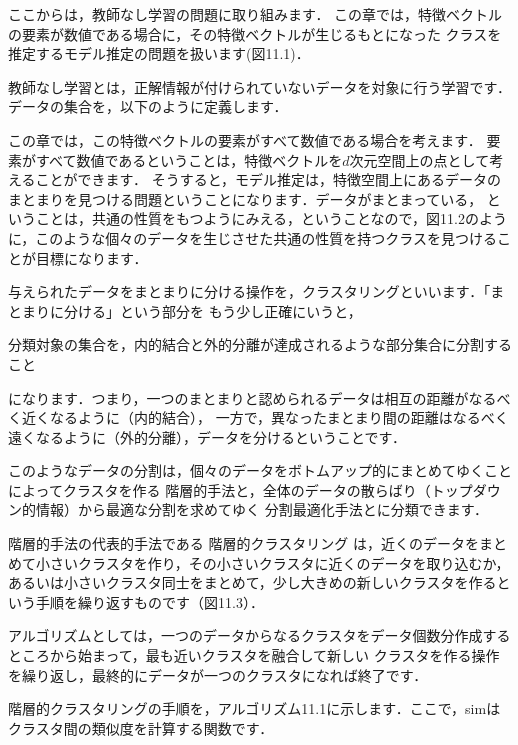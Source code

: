
ここからは，教師なし学習の問題に取り組みます．
この章では，特徴ベクトルの要素が数値である場合に，その特徴ベクトルが生じるもとになった
クラスを推定するモデル推定の問題を扱います(図11.1)．


教師なし学習とは，正解情報が付けられていないデータを対象に行う学習です．
データの集合を，以下のように定義します．

この章では，この特徴ベクトルの要素がすべて数値である場合を考えます．
要素がすべて数値であるということは，特徴ベクトルを$d$次元空間上の点として考えることができます．
そうすると，モデル推定は，特徴空間上にあるデータのまとまりを見つける問題ということになります．データがまとまっている，
ということは，共通の性質をもつようにみえる，ということなので，図11.2のように，このような個々のデータを生じさせた共通の性質を持つクラスを見つけることが目標になります．


与えられたデータをまとまりに分ける操作を，クラスタリングといいます．「まとまりに分ける」という部分を
もう少し正確にいうと，

分類対象の集合を，内的結合と外的分離が達成されるような部分集合に分割すること

になります．つまり，一つのまとまりと認められるデータは相互の距離がなるべく近くなるように（内的結合），
一方で，異なったまとまり間の距離はなるべく遠くなるように（外的分離），データを分けるということです．

このようなデータの分割は，個々のデータをボトムアップ的にまとめてゆくことによってクラスタを作る
階層的手法と，全体のデータの散らばり（トップダウン的情報）から最適な分割を求めてゆく
分割最適化手法とに分類できます．


階層的手法の代表的手法である
階層的クラスタリング
は，近くのデータをまとめて小さいクラスタを作り，その小さいクラスタに近くのデータを取り込むか，あるいは小さいクラスタ同士をまとめて，少し大きめの新しいクラスタを作るという手順を繰り返すものです（図11.3）．

アルゴリズムとしては，一つのデータからなるクラスタをデータ個数分作成するところから始まって，最も近いクラスタを融合して新しい
クラスタを作る操作を繰り返し，最終的にデータが一つのクラスタになれば終了です．


階層的クラスタリングの手順を，アルゴリズム11.1に示します．ここで，simはクラスタ間の類似度を計算する関数です．

